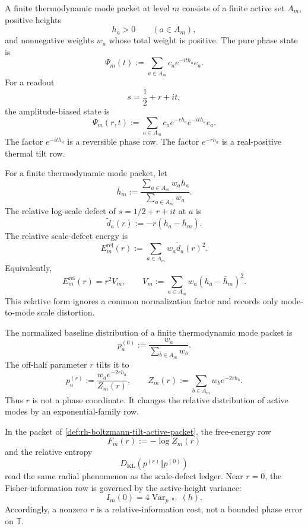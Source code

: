\begin{definition}
\label{def:rh-finite-thermodynamic-mode-packet}
A finite thermodynamic mode packet at level $m$ consists of a finite
active set $A_m$, positive heights
$$
h_a>0
\qquad
(a\in A_m),
$$
and nonnegative weights $w_a$ whose total weight is positive.  The pure
phase state is
$$
\Psi_m(t)
:=
\sum_{a\in A_m}c_a e^{-it h_a}e_a.
$$
For a readout
$$
s=\frac12+r+it,
$$
the amplitude-biased state is
$$
\Psi_m(r,t)
:=
\sum_{a\in A_m}c_a e^{-r h_a}e^{-it h_a}e_a.
$$
The factor $e^{-it h_a}$ is a reversible phase row.  The factor
$e^{-r h_a}$ is a real-positive thermal tilt row.
\end{definition}

\begin{definition}
\label{def:rh-relative-scale-defect-energy}
For a finite thermodynamic mode packet, let
$$
\bar h_m
:=
\frac{\sum_{a\in A_m}w_a h_a}{\sum_{a\in A_m}w_a}.
$$
The relative log-scale defect of $s=1/2+r+it$ at $a$ is
$$
\widetilde d_a(r)
:=
-r(h_a-\bar h_m).
$$
The relative scale-defect energy is
$$
E_m^{\mathrm{rel}}(r)
:=
\sum_{a\in A_m}w_a\widetilde d_a(r)^2.
$$
Equivalently,
$$
E_m^{\mathrm{rel}}(r)
=
r^2V_m,
\qquad
V_m:=
\sum_{a\in A_m}w_a(h_a-\bar h_m)^2.
$$
This relative form ignores a common normalization factor and records only
mode-to-mode scale distortion.
\end{definition}

\begin{definition}
\label{def:rh-boltzmann-tilt-active-packet}
The normalized baseline distribution of a finite thermodynamic mode
packet is
$$
p_a^{(0)}
:=
\frac{w_a}{\sum_{b\in A_m}w_b}.
$$
The off-half parameter $r$ tilts it to
$$
p_a^{(r)}
:=
\frac{w_a e^{-2r h_a}}{Z_m(r)},
\qquad
Z_m(r)
:=
\sum_{b\in A_m}w_b e^{-2r h_b}.
$$
Thus $r$ is not a phase coordinate.  It changes the relative distribution
of active modes by an exponential-family row.
\end{definition}

\begin{principle}
\label{prin:rh-relative-entropy-detects-radial-tilt}
In the packet of \autoref{def:rh-boltzmann-tilt-active-packet}, the
free-energy row
$$
F_m(r):=-\log Z_m(r)
$$
and the relative entropy
$$
D_{\mathrm{KL}}(p^{(r)}\Vert p^{(0)})
$$
read the same radial phenomenon as the scale-defect ledger.  Near
$r=0$, the Fisher-information row is governed by the active-height
variance:
$$
I_m(0)=4\operatorname{Var}_{p^{(0)}}(h).
$$
Accordingly, a nonzero $r$ is a relative-information cost, not a
bounded phase error on $\mathbb T$.
\end{principle}


